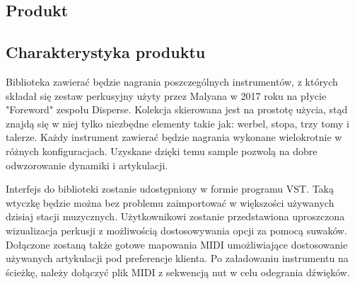 \documentclass[12pt]{article}
\begin{document}


\subsection{Produkt}



\subsection{Charakterystyka produktu}


Biblioteka zawierać będzie nagrania poszczególnych instrumentów, z których
składał się zestaw perkusyjny użyty przez Malyana w 2017 roku na płycie
"Foreword" zespołu Disperse. Kolekcja skierowana jest na prostotę użycia, stąd
znajdą się w niej tylko niezbędne elementy takie jak: werbel, stopa, trzy tomy
i talerze. Każdy instrument zawierać będzie nagrania wykonane wielokrotnie w
różnych konfiguracjach. Uzyskane dzięki temu sample pozwolą na dobre
odwzorowanie dynamiki i artykulacji.

Interfejs do biblioteki zostanie udostępniony w formie programu VST. Taką
wtyczkę będzie można bez problemu zaimportować w większości używanych dzisiaj
stacji muzycznych. Użytkownikowi zostanie przedstawiona uproszczona
wizualizacja perkusji z możliwością dostosowywania opcji za pomocą suwaków.
Dołączone zostaną także gotowe mapowania MIDI umożliwiające dostosowanie
używanych artykulacji pod preferencje klienta. Po załadowaniu instrumentu na
ścieżkę, należy dołączyć plik MIDI z sekwencją nut w celu odegrania dźwięków.
\end{document}
